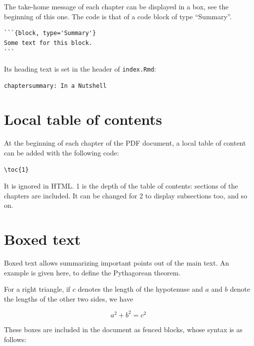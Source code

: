 \documentclass[
  12pt,
  american,
  a4paper,
  extrafontsizes,onecolumn,openright
  ]{memoir}
\newcommand{\toc}[1]{%
  \startcontents[chapters]%
  \printcontents[chapters]{}{1}[#1]{}%
  ~\newline%
}
\begin{document}
The take-home message of each chapter can be displayed in a box, see the beginning of this one.
The code is that of a code block of type \enquote{Summary}.

\begin{verbatim}
```{block, type='Summary'}
Some text for this block.
```
\end{verbatim}

Its heading text is set in the header of \texttt{index.Rmd}:

\begin{verbatim}
chaptersummary: In a Nutshell
\end{verbatim}

\hypertarget{local-table-of-contents}{%
\section{Local table of contents}\label{local-table-of-contents}}

At the beginning of each chapter of the PDF document, a local table of content can be added with the following code:

\begin{verbatim}
\toc{1}
\end{verbatim}

It is ignored in HTML.
1 is the depth of the table of contents: sections of the chapters are included.
It can be changed for 2 to display subsections too, and so on.

\hypertarget{boxed-text}{%
\section{Boxed text}\label{boxed-text}}

Boxed text allows summarizing important points out of the main text.
An example is given here, to define the Pythagorean theorem.



\leavevmode{}%
\begin{greybox}[frametitle=Pythagorean theorem]
For a right triangle, if \(c\) denotes the length of the hypotenuse
and \(a\) and \(b\) denote the lengths of the other two sides, we have

\[a^2 + b^2 = c^2\]

\end{greybox}

These boxes are included in the document as fenced blocks, whose syntax is as follows:
\end{document}
